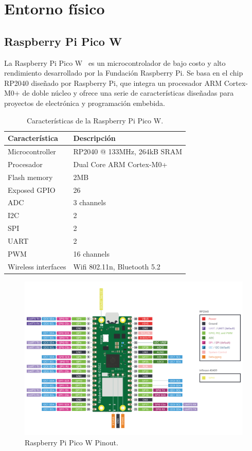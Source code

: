 \section{Entorno físico}
\subsection{Raspberry Pi Pico W}
La Raspberry Pi Pico W~\cite{manual:RPiPicoW_datasheet} es un microcontrolador de bajo costo y alto rendimiento desarrollado por la Fundación Raspberry Pi. Se basa en el chip RP2040 diseñado por Raspberry Pi, que integra un procesador ARM Cortex-M0+ de doble núcleo y ofrece una serie de características diseñadas para proyectos de electrónica y programación embebida.

\begin{table}[htbp]
\begin{center}
\caption{Características de la Raspberry Pi Pico W.}
\begin{tabular}{|l|l|}
\hline
\rowcolor[HTML]{C0C0C0} 
\textbf{Característica} & \textbf{Descripción}\\ \hline
Microcontroller	& RP2040 @ 133MHz, 264kB SRAM \\ \hline
Procesador & Dual Core ARM Cortex-M0+ \\ \hline
Flash memory &	2MB \\ \hline
Exposed GPIO & 26 \\ \hline
ADC	& 3 channels \\ \hline
I2C	& 2 \\ \hline
SPI	& 2 \\ \hline
UART & 2 \\ \hline
PWM	& 16 channels	 \\ \hline
Wireless interfaces & Wifi 802.11n, Bluetooth 5.2\\ \hline
\end{tabular}
\end{center}
\end{table}
\pagebreak

\begin{figure}[h]
    \centering
    \includegraphics[width=1\textwidth]{img/herramientas/picow.png}
    \caption{Raspberry Pi Pico W Pinout.}
\end{figure}

